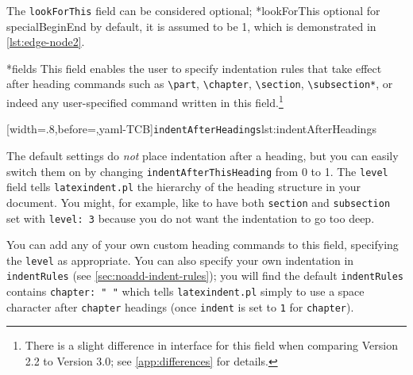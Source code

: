  The \texttt{lookForThis} field can be considered optional;
 *{lookForThis optional for specialBeginEnd} by default, it is
 assumed to be 1, which is demonstrated in \cref{lst:edge-node2}.%

*{fields}
 This field enables the user to specify indentation rules that take effect after heading
 commands such as \lstinline!\part!, \lstinline!\chapter!, \lstinline!\section!,
 \lstinline!\subsection*!, or indeed any user-specified command written in this
 field.\footnote{There is a slight difference in interface for this field when comparing
 Version 2.2 to Version 3.0; see \vref{app:differences} for details.}

 [width=.8\linewidth,before=\centering,yaml-TCB]{\texttt{indentAfterHeadings}}{lst:indentAfterHeadings}

 The default settings do \emph{not} place indentation after a heading, but you can easily
 switch them on by changing \texttt{indentAfterThisHeading} from 0 to 1. The
 \texttt{level} field tells \texttt{latexindent.pl} the hierarchy of the heading structure
 in your document. You might, for example, like to have both \texttt{section} and
 \texttt{subsection} set with \texttt{level: 3} because you do not want the indentation to
 go too deep.

 You can add any of your own custom heading commands to this field, specifying the
 \texttt{level} as appropriate. You can also specify your own indentation in
 \texttt{indentRules} (see \vref{sec:noadd-indent-rules}); you will find the default
 \texttt{indentRules} contains \lstinline!chapter: " "! which tells
 \texttt{latexindent.pl} simply to use a space character after \texttt{chapter} headings
 (once \texttt{indent} is set to \texttt{1} for \texttt{chapter}).

